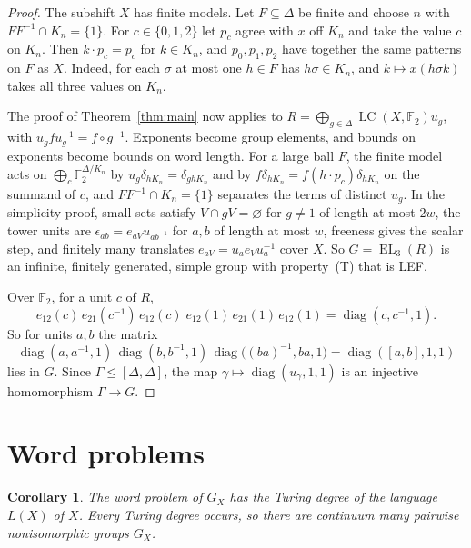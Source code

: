 \documentclass[11pt]{amsart}
\newtheorem{corollary}[theorem]{Corollary}
\newcommand{\F}{\mathbb F}
\newcommand{\LC}{\operatorname{LC}}
\newcommand{\EL}{\operatorname{EL}}
\newcommand{\diag}{\operatorname{diag}}
\begin{document}
\begin{proof}
The subshift $X$ has finite models. Let $F\subseteq\Delta$ be finite and
choose $n$ with $FF^{-1}\cap K_n=\{1\}$. For $c\in\{0,1,2\}$ let $p_c$
agree with $x$ off $K_n$ and take the value $c$ on $K_n$. Then
$k\cdot p_c=p_c$ for $k\in K_n$, and $p_0,p_1,p_2$ have together the same
patterns on $F$ as $X$. Indeed, for each $\sigma$ at most one $h\in F$ has
$h\sigma\in K_n$, and $k\mapsto x(h\sigma k)$ takes all three values on
$K_n$.

The proof of Theorem~\ref{thm:main} now applies to
$R=\bigoplus_{g\in\Delta}\LC(X,\F_2)u_g$, with $u_gfu_g^{-1}=f\circ g^{-1}$.
Exponents become group elements, and bounds on exponents become bounds
on word length. For a large ball $F$, the finite model acts on
$\bigoplus_c\F_2^{\Delta/K_n}$ by $u_g\delta_{hK_n}=\delta_{ghK_n}$ and by
$f\delta_{hK_n}=f(h\cdot p_c)\delta_{hK_n}$ on the summand of $c$, and
$FF^{-1}\cap K_n=\{1\}$ separates the terms of distinct $u_g$. In the
simplicity proof, small sets satisfy $V\cap gV=\varnothing$ for $g\ne1$
of length at most $2w$, the tower units are $\epsilon_{ab}=e_{aV}u_{ab^{-1}}$
for $a,b$ of length at most $w$, freeness gives the scalar step, and
finitely many translates $e_{aV}=u_ae_Vu_a^{-1}$ cover $X$. So
$G=\EL_3(R)$ is an infinite, finitely generated, simple group with
property~\textup{(T)} that is LEF.

Over $\F_2$, for a unit $c$ of $R$,
\[
 e_{12}(c)\,e_{21}(c^{-1})\,e_{12}(c)\;e_{12}(1)\,e_{21}(1)\,e_{12}(1)
 =\diag(c,c^{-1},1).
\]
So for units $a,b$ the matrix
\[
 \diag(a,a^{-1},1)\,\diag(b,b^{-1},1)\,\diag\bigl((ba)^{-1},ba,1\bigr)
 =\diag([a,b],1,1)
\]
lies in $G$. Since $\Gamma\le[\Delta,\Delta]$, the map
$\gamma\mapsto\diag(u_\gamma,1,1)$ is an injective homomorphism
$\Gamma\to G$.
\end{proof}

\section{Word problems}

\begin{corollary}\label{cor:wp}
The word problem of $G_X$ has the Turing degree of the language $L(X)$
of $X$. Every Turing degree occurs, so there are continuum many pairwise
nonisomorphic groups $G_X$.
\end{corollary}
\end{document}
